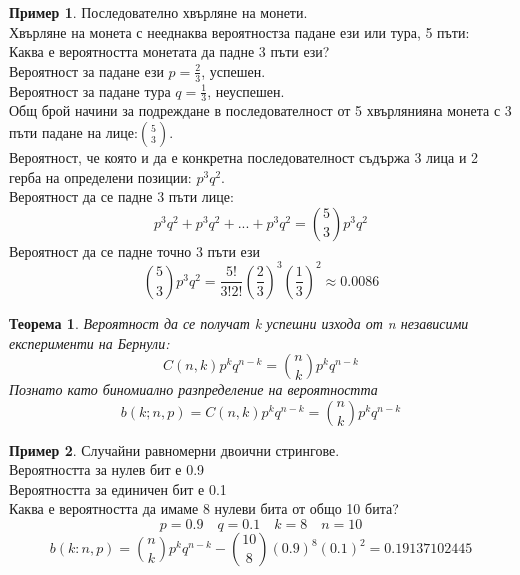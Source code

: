 \documentclass[fleqn, 12pt]{article}
\newtheorem{theorem}{Теорема}[subsection]
\theoremstyle{definition}
\newtheorem{example}{Пример}[subsection]
\begin{document}
\begin{example}
Последователно хвърляне на монети.\\
Хвърляне на монета с нееднаква вероятностза падане ези или тура, 5 пъти:\\
Каква е вероятността монетата да падне 3 пъти ези?\\
Вероятност за падане ези $p = \frac{2}{3}$, успешен. \\
Вероятност за падане тура $q = \frac{1}{3}$, неуспешен. \\
Общ брой начини за подреждане в последователност от 5 хвърлянияна монета с 3 пъти падане на лице:$\binom 5 3$.\\
Вероятност, че която и да е конкретна последователност съдържа 3 лица и 2 герба на определени позиции: $p^3q^2$. \\
Вероятност да се падне 3 пъти лице:
$$p^3q^2 + p^3q^2 + ... + p^3q^2 = \binom 5 3 p^3q^2$$
Вероятност да се падне точно 3 пъти ези 
$$\binom 5 3 p^3q^2 = \frac{5!}{3!2!}\left( \frac{2}{3} \right)^3 \left( \frac{1}{3} \right)^2 \approx 0.0086$$
\end{example}

\begin{theorem}
Вероятност да се получат k успешни изхода от n независими експерименти на Бернули:
$$C(n,k)p^kq^{n-k} = \binom n k p^kq^{n-k}$$
Познато като биномиално разпределение на вероятността
$$b(k;n,p) = C(n,k)p^kq^{n-k} = \binom n k p^kq^{n-k}$$
\end{theorem}

\begin{example}
Случайни равномерни двоични стрингове. \\
Вероятността за нулев бит е 0.9 \\
Вероятността за единичен бит е 0.1\\
Каква е вероятността да имаме 8 нулеви бита от общо 10 бита?\\
$$p = 0.9 \quad q = 0.1 \quad k = 8 \quad n = 10$$
$$b(k:n,p) = \binom n k p^kq^{n-k} - \binom {10} 8 (0.9)^8 (0.1)^{2} = 0.19137102445$$
\end{example}
\end{document}
